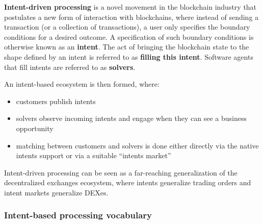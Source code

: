 \documentclass[a4paper]{article}
\begin{document}
\textbf{Intent-driven processing} is a novel movement in the blockchain industry that postulates a new form of interaction with blockchains, where instead of sending a transaction (or a collection of transactions), a user only specifies the boundary conditions for a desired outcome. A specification of such boundary conditions is otherwise known as an \textbf{intent}. The act of bringing the blockchain state to the shape defined by an intent is referred to as \textbf{filling this intent}. Software agents that fill intents are referred to as \textbf{solvers}.

An intent-based ecosystem is then formed, where:

\begin{itemize}
  \item customers publish intents
  \item solvers observe incoming intents and engage when they can see a business opportunity
  \item matching between customers and solvers is done either directly via the native intents support or via a suitable ``intents market''
\end{itemize}

Intent-driven processing can be seen as a far-reaching generalization of the decentralized exchanges ecosystem, where intents generalize trading orders and intent markets generalize DEXes.

\subsubsection{Intent-based processing vocabulary}
\end{document}
